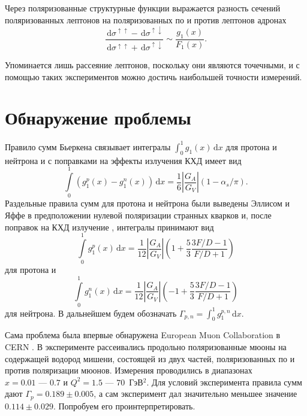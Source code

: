 \documentclass[
	a4paper, 10pt,
	twocolumn
]{article}
\def\d{\,\mathrm{d}}
\def\div{\text{ --- }}
\begin{document}
Через поляризованные структурные функции выражается разность сечений поляризованных лептонов на поляризованных по и против лептонов адронах 
\begin{equation*}
\frac{\d\sigma^{\uparrow\uparrow} - \d\sigma^{\uparrow\downarrow}}
	{\d\sigma^{\uparrow\uparrow} + \d\sigma^{\uparrow\downarrow}} 
	\sim 
	\frac{g_1(x)}{F_1(x)}.
\label{eq:sigma.asym}
\end{equation*}

Упоминается лишь рассеяние лептонов, поскольку они являются точечными, и с помощью таких экспериментов можно достичь наибольшей точности измерений. 





\section{Обнаружение проблемы}
Правило сумм Бьеркена \cite{Bjorken1, Bjorken2} связывает интегралы $\int _0^1 g_1(x)\d x$ для протона и нейтрона и с поправками на эффекты излучения КХД \cite{Bj.fix1, Bj.fix2} имеет вид
\begin{equation}
\int\limits_0^1 \left(g_1^p(x) - g_1^n(x)\right)\d x = \frac{1}{6}\left|\frac{G_A}{G_V}\right|(1-\alpha_s/\pi).
\label{eq:gp-gn}
\end{equation}
Раздельные правила сумм для протона и нейтрона были выведены Эллисом и Яффе \cite{Ellis-Jaffe} в предположении нулевой поляризации странных кварков и, после поправок на КХД излучение \cite{E-J.fix}, интегралы принимают вид
\begin{equation}
\int\limits_0^1 g_1^p(x)\d x = \frac{1}{12}\left|\frac{G_A}{G_V}\right|\left(1+\frac{5}{3}\frac{3F/D - 1}{F/D + 1}\right) 
\label{eq:gp}
\end{equation}
для протона и 
\begin{equation}
\int\limits_0^1 g_1^n(x)\d x = \frac{1}{12}\left|\frac{G_A}{G_V}\right|\left(-1+\frac{5}{3}\frac{3F/D - 1}{F/D + 1}\right) 
\label{eq:gn}
\end{equation}
для нейтрона. В дальнейшем будем обозначать $\Gamma_{p,n} = \int_0^1 g_1^{p,n}\d x$.





Сама проблема была впервые обнаружена European Muon Collaboration в CERN \cite{MuonCollab}. В эксперименте рассеивались продольно поляризованные мюоны на содержащей водород мишени, состоящей из двух частей, поляризованных по и против поляризации мюонов. Измерения проводились в диапазонах $x = 0.01 \div 0.7$ и $Q^2 = 1.5 \div 70$~ГэВ$^2$.
Для условий эксперимента правила сумм дают $\Gamma_p = 0.189\pm0.005$, а сам эксперимент дал значительно меньшее значение $0.114\pm0.029$. Попробуем его проинтерпретировать. 
\end{document}
